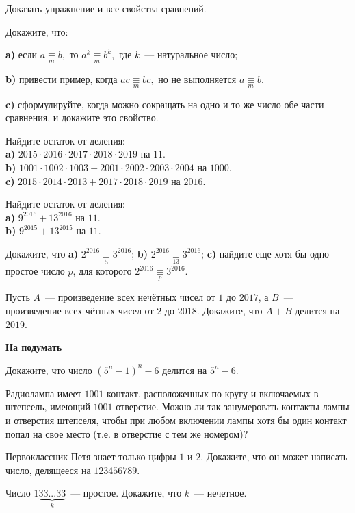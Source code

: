 \begin{problems}

\item Доказать упражнение и все свойства сравнений. 
\item Докажите, что:

\textbf{a)} если $a  \mathop{\equiv}\limits_m b,$   то $a^k  \mathop{\equiv}\limits_m b^k,$  где $k$~--- натуральное число;

\textbf{b)} привести пример, когда $ac \mathop{\equiv}\limits_m bc  ,$ но не выполняется $a \mathop{\equiv}\limits_m b  .$

\textbf{c)} сформулируйте, когда можно сокращать на одно и то же число обе части сравнения, и докажите это свойство.
\item Найдите остаток от деления:\\
\textbf{a)} $2015 \cdot 2016 \cdot 2017 \cdot 2018 \cdot 2019$ на $11$.\\
\textbf{b)} $1001 \cdot 1002 \cdot 1003+2001 \cdot 2002 \cdot 2003\cdot 2004$ на $1000$.\\
\textbf{c)} $2015 \cdot 2014 \cdot 2013+2017 \cdot 2018 \cdot 2019$ на $2016$.
\item Найдите остаток от деления:\\
\textbf{a)} $9^{2016}+13^{2016}$ на $11$.\\
\textbf{b)} $9^{2015}+13^{2015}$ на $11$.
\item Докажите, что \textbf{a)} $2^{2016} \mathop{\equiv}\limits_5 3^{2016}$; \textbf{b)} $2^{2016} \mathop{\equiv}\limits_{13} 3^{2016}$;  \textbf{c)} найдите еще хотя бы одно простое число $p$, для которого $2^{2016} \mathop{\equiv}\limits_{p} 3^{2016}$.
\item  Пусть $A$~--- произведение всех нечётных чисел от $1$ до $2017$, а $B$~--- произведение всех чётных чисел от $2$ до $2018$. Докажите, что $A + B$ делится на $2019$.

\end{problems}

\begin{center}
\textbf{На подумать}\\
\end{center}

\begin{problems}
\item Докажите, что число $(5^n-1)^n-6$ делится на $5^n-6$. 

\item Радиолампа имеет $1001$ контакт, расположенных по кругу и включаемых в штепсель, имеющий $1001$ отверстие. Можно ли так занумеровать контакты лампы и отверстия штепселя, чтобы при любом включении лампы хотя бы один контакт попал на свое место (т.е. в отверстие с тем же номером)?  

\item Первоклассник Петя знает только цифры $1$ и $2$. Докажите, что он может написать число, делящееся на $123456789$.

\item Число $1\underbrace{33...33}_k$~--- простое. Докажите, что $k$~--- нечетное. 
\end{problems}
